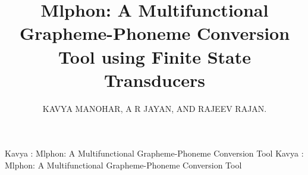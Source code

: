 \documentclass{ieeeaccess}
\begin{document}
\doi{}

\title{Mlphon: A Multifunctional Grapheme-Phoneme Conversion Tool using Finite State Transducers}
\author{\uppercase{Kavya Manohar}, %
\uppercase{A R Jayan, and Rajeev Rajan}.
}
\address[1]{%
College of Engineering Trivandrum,
Kerala - 695 586 India}
\address[2]{Government Engineering College, Thrissur, Kerala, India}
\address[3]{APJ Abdul Kalam Technological University, Kerala, India }

\markboth
{Kavya \headeretal: Mlphon: A Multifunctional Grapheme-Phoneme Conversion Tool}
{Kavya \headeretal: Mlphon: A Multifunctional Grapheme-Phoneme Conversion Tool}

\end{document}

